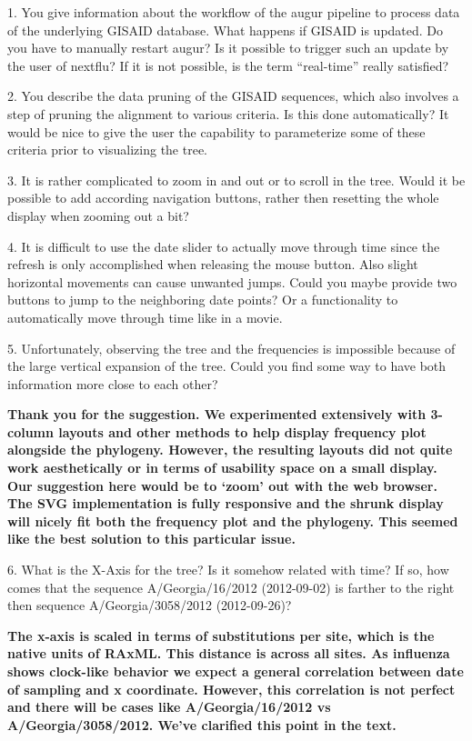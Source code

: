 \documentclass[11pt,oneside,letterpaper]{article}
\begin{document}
1. You give information about the workflow of the augur pipeline to process data of the underlying GISAID database. What happens if GISAID is updated. Do you have to manually restart augur? Is it possible to trigger such an update by the user of nextflu? If it is not possible, is the term ``real-time'' really satisfied?

2. You describe the data pruning of the GISAID sequences, which also involves a step of pruning the alignment to various criteria. Is this done automatically? It would be nice to give the user the capability to parameterize some of these criteria prior to visualizing the tree.

3. It is rather complicated to zoom in and out or to scroll in the tree. Would it be possible to add according navigation buttons, rather then resetting the whole display when zooming out a bit?

4. It is difficult to use the date slider to actually move through time since the refresh is only accomplished when releasing the mouse button. Also slight horizontal movements can cause unwanted jumps. Could you maybe provide two buttons to jump to the neighboring date points? Or a functionality to automatically move through time like in a movie.

5. Unfortunately, observing the tree and the frequencies is impossible because of the large vertical expansion of the tree. Could you find some way to have both information more close to each other?

\textbf{Thank you for the suggestion. We experimented extensively with 3-column layouts and other methods to help display frequency plot alongside the phylogeny. However, the resulting layouts did not quite work aesthetically or in terms of usability space on a small display. Our suggestion here would be to `zoom' out with the web browser. The SVG implementation is fully responsive and the shrunk display will nicely fit both the frequency plot and the phylogeny. This seemed like the best solution to this particular issue.}

6. What is the X-Axis for the tree? Is it somehow related with time? If so, how comes that the sequence A/Georgia/16/2012 (2012-09-02) is farther to the right then sequence A/Georgia/3058/2012 (2012-09-26)?

\textbf{The x-axis is scaled in terms of substitutions per site, which is the native units of RAxML. This distance is across all sites. As influenza shows clock-like behavior we expect a general correlation between date of sampling and x coordinate. However, this correlation is not perfect and there will be cases like A/Georgia/16/2012 vs A/Georgia/3058/2012. We've clarified this point in the text.}
\end{document}
